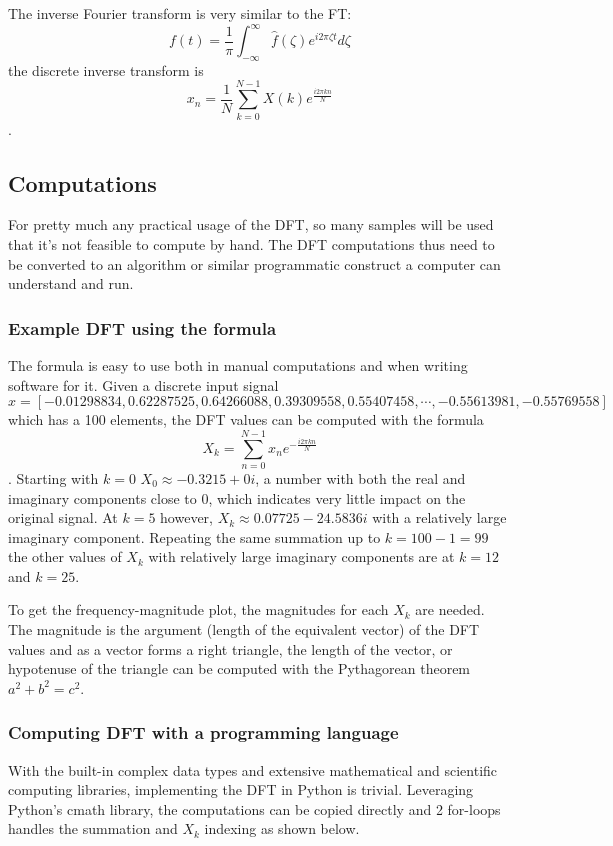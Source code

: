 The inverse Fourier transform is very similar to the FT:
$$ f(t) = \frac{1}{\pi}\int_{-\infty}^{\infty} \hat{f}(\zeta)e^{i2\pi\zeta t} d\zeta$$
the discrete inverse transform is 
$$ x_n = \frac{1}{N}\sum_{k=0}^{N-1} X(k)e^{\frac{i2\pi kn}{N}}$$.

\subsection{Computations}
For pretty much any practical usage of the DFT, so many samples will be used that it's not feasible to compute by hand. The DFT computations thus need to be converted to an algorithm or similar programmatic construct a computer can understand and run.
\subsubsection{Example DFT using the formula}
The formula is easy to use both in manual computations and when writing software for it. Given a discrete input signal $$x = [-0.01298834,  0.62287525,  0.64266088,  0.39309558,  0.55407458, \cdots , -0.55613981, -0.55769558]$$ which has a 100 elements, the DFT values can be computed with the formula $$X_k = \sum_{n=0}^{N-1} x_ne^{-\frac{i2\pi kn}{N}}$$. Starting with $k=0$ $X_0 \approx -0.3215+0i$, a number with both the real and imaginary components close to 0, which indicates very little impact on the original signal. At $k=5$ however, $X_k \approx 0.07725-24.5836i$ with a relatively large imaginary component. Repeating the same summation up to $k=100-1 = 99$ the other values of $X_k$ with relatively large imaginary components are at $k=12$ and $k=25$. 

To get the frequency-magnitude plot, the magnitudes for each $X_k$ are needed. The magnitude is the argument (length of the equivalent vector) of the DFT values and as a vector forms a right triangle, the length of the vector, or hypotenuse of the triangle can be computed with the Pythagorean theorem $a^2 + b^2 = c^2$. 


\subsubsection{Computing DFT with a programming language}
With the built-in complex data types and extensive mathematical and scientific computing libraries, implementing the DFT in Python is trivial. Leveraging Python's cmath library, the computations can be copied directly and 2 for-loops handles the summation and $X_k$ indexing as shown below.

